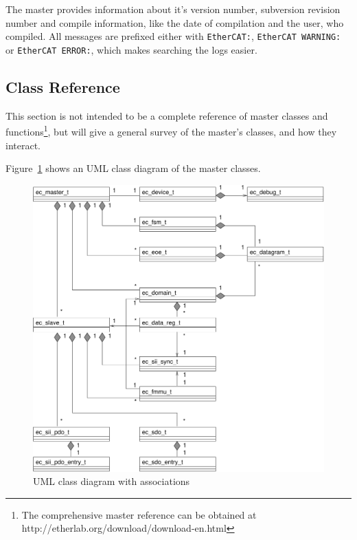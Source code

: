 \documentclass[a4paper,12pt,BCOR6mm,bibtotoc,idxtotoc]{scrbook}
\begin{document}
The master provides information about it's version number, subversion
revision number and compile information, like the date of compilation
and the user, who compiled. All messages are prefixed either with
\texttt{EtherCAT:}, \texttt{EtherCAT WARNING:} or \texttt{EtherCAT
  ERROR:}, which makes searching the logs easier.


\subsection{Class Reference}
\label{sec:classes}

This section is not intended to be a complete reference of master
classes and functions\footnote{The comprehensive master reference can
  be obtained at http://etherlab.org/download/download-en.html}, but
will give a general survey of the master's classes, and how they
interact.

Figure~\ref{fig:uml-all} shows an UML class diagram of the master
classes.

\begin{figure}[htbp]
  \centering
  \includegraphics[width=\textwidth]{images/uml-all}
  \caption{UML class diagram with associations}
  \label{fig:uml-all}
\end{figure}
\end{document}
